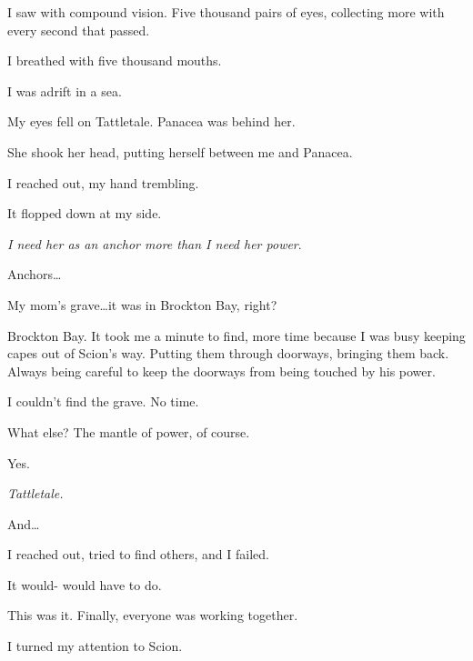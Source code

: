 I saw with compound vision.  Five thousand pairs of eyes, collecting more with every second that passed.



I breathed with five thousand mouths.



I was adrift in a sea.



My eyes fell on Tattletale.  Panacea was behind her.



She shook her head, putting herself between me and Panacea.



I reached out, my hand trembling.



It flopped down at my side.



\emph{I need her as an anchor more than I need her power}.



Anchors\ldots



My mom's grave\ldots it was in Brockton Bay, right?



Brockton Bay.  It took me a minute to find, more time because I was busy keeping capes out of Scion's way.  Putting them through doorways, bringing them back.  Always being careful to keep the doorways from being touched by his power.



I couldn't find the grave.  No time.



What else?  The mantle of power, of course.



Yes.



\emph{Tattletale.}



And\ldots



I reached out, tried to find others, and I failed.



It would- would have to do.



This was it.  Finally, everyone was working together.



I turned my attention to Scion.





